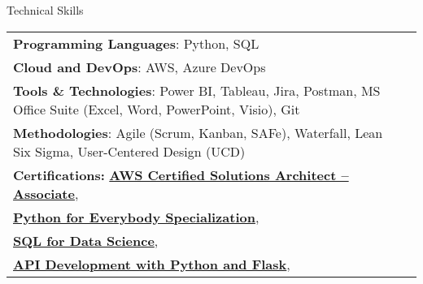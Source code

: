 \documentclass{resume} %
\begin{document}
    \begin{rSection}{Technical Skills}
        \begin{tabular}{ @{} l @{\hspace{1ex}} l }
                                \textbf{Programming Languages}: Python, SQL\\
                                \textbf{Cloud and DevOps}: AWS, Azure DevOps\\
                                \textbf{Tools \& Technologies}: Power BI, Tableau, Jira, Postman, MS Office Suite (Excel, Word, PowerPoint, Visio), Git\\
                                \textbf{Methodologies}: Agile (Scrum, Kanban, SAFe), Waterfall, Lean Six Sigma, User{-}Centered Design (UCD)\\
                        \textbf{Certifications:} 
                                            \href{https://aws.amazon.com/certification/certified{-}solutions{-}architect{-}associate/}{\textbf{AWS Certified Solutions Architect – Associate}},\\
                                            \href{https://www.coursera.org/account/accomplishments/specialization/ABC123XYZ}{\textbf{Python for Everybody Specialization}},\\
                                            \href{https://www.coursera.org/account/accomplishments/verify/XYZ456ABC}{\textbf{SQL for Data Science}},\\
                                            \href{https://www.udemy.com/certificate/UC{-}1234567890/}{\textbf{API Development with Python and Flask}},\\
                                 
        \end{tabular}
    \end{rSection}
 
\end{document}
